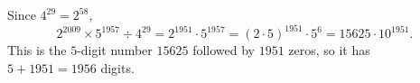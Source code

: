Since $4^{29}=2^{58}$,
\[
2^{2009}\times5^{1957}\div4^{29}=2^{1951}\cdot5^{1957}=(2\cdot5)^{1951}\cdot5^{6}=15625\cdot10^{1951}.
\]
This is the $5$-digit number $15625$ followed by $1951$ zeros, so it has $5+1951=\boxed{1956}$ digits.
